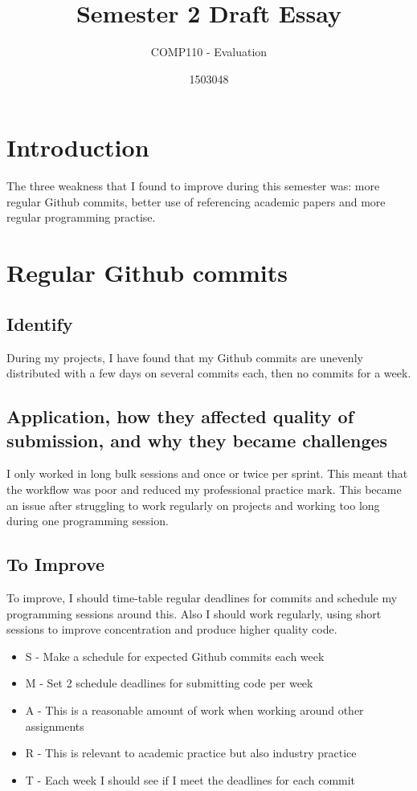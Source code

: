 \documentclass{scrartcl}
\title{Semester 2 Draft Essay}
\subtitle{COMP110 - Evaluation}
\author{1503048}
\begin{document}
\maketitle

\section*{Introduction}
The three weakness that I found to improve during this semester was: more regular Github commits, better use of referencing academic papers and more regular programming practise.

\section*{Regular Github commits}
\subsection*{Identify}
During my projects, I have found that my Github commits are unevenly distributed with a few days on several commits each, then no commits for a week.

\subsection*{Application, how they affected quality of submission, and why they became challenges}
I only worked in long bulk sessions and once or twice per sprint. This meant that the workflow was poor and reduced my professional practice mark. This became an issue after struggling to work regularly on projects and working too long during one programming session.

\subsection*{To Improve}
To improve, I should time-table regular deadlines for commits and schedule my programming sessions around this. Also I should work regularly, using short sessions to improve concentration and produce higher quality code.

 \begin{itemize}
   \item  S - Make a schedule for expected Github commits each week
	\item M - Set 2 schedule deadlines for submitting code per week
	\item A - This is a reasonable amount of work when working around other assignments
	\item R - This is relevant to academic practice but also industry practice
	\item T - Each week I should see if I meet the deadlines for each commit
 \end{itemize}
\end{document}
